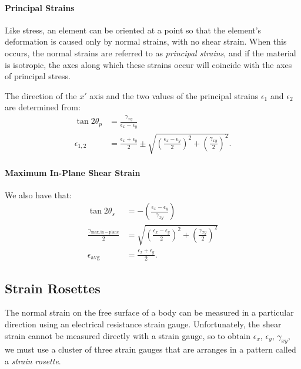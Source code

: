 \paragraph{Principal Strains}
Like stress, an element can be oriented at a point so that the element's deformation is caused only by normal strains, with no shear strain. 
When this occurs, the normal strains are referred to as \textit{principal strains}, and if the material is isotropic, the axes along which these strains occur will coincide with the axes of principal stress.

The direction of the $x'$ axis and the two values of the principal strains $\epsilon_1$ and $\epsilon_2$ are determined from:
\begin{align*}
  \tan 2\theta_p &= \frac{\gamma_{xy}}{\epsilon_x - \epsilon_y} \\
  \epsilon_{1,2} &= \frac{\epsilon_x + \epsilon_y}{2} \pm \sqrt{\left( \frac{\epsilon_x - \epsilon_y}{2} \right)^2 + \left( \frac{\gamma_{xy}}{2} \right)^2}
.\end{align*}

\paragraph{Maximum In-Plane Shear Strain}
We also have that:
\begin{align*}
  \tan 2\theta_s &= - \left( \frac{\epsilon_x - \epsilon_y}{\gamma_{xy}} \right) \\
  \frac{\gamma_{\mathrm{max}, \mathrm{in-plane}}}{2} &= \sqrt{\left( \frac{\epsilon_x - \epsilon_y}{2} \right)^2 + \left( \frac{\gamma_{xy}}{2} \right)^2} \\
  \epsilon_{\mathrm{avg}} &= \frac{\epsilon_x + \epsilon_y}{2}
.\end{align*}

\subsection{Strain Rosettes}
The normal strain on the free surface of a body can be measured in a particular direction using an electrical resistance strain gauge.
Unfortunately, the shear strain cannot be measured directly with a strain gauge, so to obtain $\epsilon_x$, $\epsilon_y$, $\gamma_{xy}$, we must use a cluster of three strain gauges that are arranges in a pattern called a \textit{strain rosette}.

